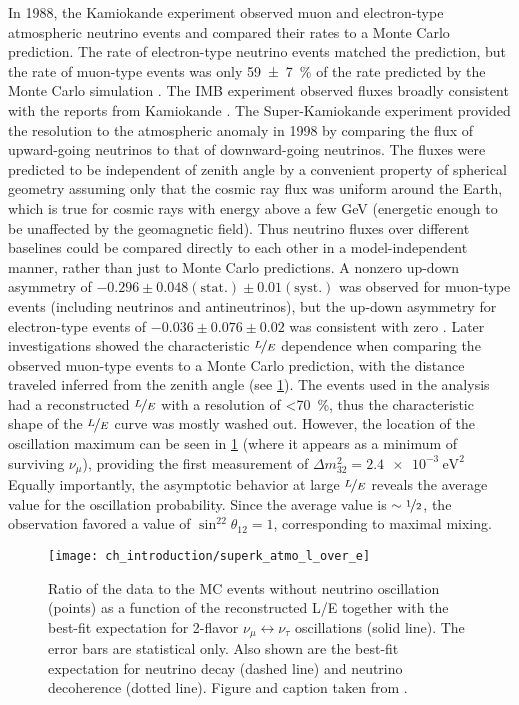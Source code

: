 In 1988, the Kamiokande experiment observed muon and electron-type
atmospheric neutrino events and compared their rates to a Monte Carlo prediction.
The rate of electron-type neutrino events matched the prediction,
but the rate of muon-type events was only \SI{59\pm7}{\percent}
of the rate predicted by the Monte Carlo simulation \cite{kamiokande_atmo}.
The IMB experiment observed fluxes broadly consistent with
the reports from Kamiokande \cite{imb_atmo}.
The Super-Kamiokande experiment provided the resolution
to the atmospheric anomaly in 1998
by comparing the flux of upward-going neutrinos
to that of downward-going neutrinos.
The fluxes were predicted to be independent of zenith angle
by a convenient property of spherical geometry
assuming only that the cosmic ray flux was uniform around the Earth,
which is true for cosmic rays with energy above a few \si{\GeV}
(energetic enough to be unaffected by the geomagnetic field).
Thus neutrino fluxes over different baselines
could be compared directly to each other
in a model-independent manner, rather than
just to Monte Carlo predictions.
A nonzero up-down asymmetry of $-0.296\pm0.048(\text{stat.})\pm0.01(\text{syst.})$
was observed for muon-type events (including neutrinos and antineutrinos),
but the up-down asymmetry for electron-type events
of $-0.036\pm0.076\pm0.02$ was consistent with zero \cite{superk1998}.
Later investigations \cite{superk2004} showed the characteristic $\nicefrac{L}{E}$
dependence when comparing the observed muon-type events
to a Monte Carlo prediction,
with the distance traveled inferred from the zenith angle
(see \cref{fig:superk_l_over_e}).
The events used in the analysis had a reconstructed $\nicefrac{L}{E}$
with a resolution of \SI{<70}{\percent},
thus the characteristic shape of the $\nicefrac{L}{E}$ curve
was mostly washed out.
However, the location of the oscillation maximum
can be seen in \cref{fig:superk_l_over_e}
(where it appears as a minimum of surviving $\nu_\mu$),
providing the first measurement of $\Delta m^2_{32} = \SI{2.4e-3}{\eV\squared}$
Equally importantly, the asymptotic behavior
at large $\nicefrac{L}{E}$ reveals
the average value for the oscillation probability.
Since the average value is $\sim\nicefrac{1}{2}$,
the observation favored a value of $\sin^22\theta_{12} = 1$,
corresponding to maximal mixing.

\begin{figure}
    \centering
    \texttt{[image: ch\_introduction/superk\_atmo\_l\_over\_e]}
    \caption{
        Ratio of the data to the MC events without neutrino oscillation (points)
        as a function of the reconstructed L/E together with
        the best-fit expectation for 2-flavor $\nu_\mu\leftrightarrow\nu_\tau$
        oscillations (solid line).
        The error bars are statistical only.
        Also shown are the best-fit expectation for neutrino decay (dashed line)
        and neutrino decoherence (dotted line).
        Figure and caption taken from \cite{superk2004}.
    }
    \label{fig:superk_l_over_e}
\end{figure}

